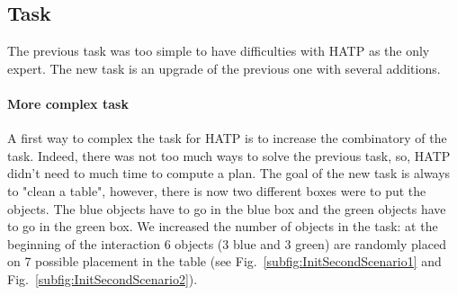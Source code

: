 \documentclass[english,a4paper,11pt,twoside]{StyleThese}
\begin{document}
\subsection{Task}

The previous task was too simple to have difficulties with HATP as the only expert. The new task is an upgrade of the previous one with several additions.


\paragraph{More complex task}

A first way to complex the task for HATP is to increase the combinatory of the task. Indeed, there was not too much ways to solve the previous task, so, HATP didn't need to much time to compute a plan. The goal of the new task is always to "clean a 
table", however, there is now two different boxes were to put the objects. The blue objects have to go in the blue box and the green objects have to go in the green box. We increased the number of objects in the task: at the beginning of the interaction 6 objects (3 blue and 3 green) are randomly placed on 7 possible placement in the table (see Fig.~\ref{subfig:InitSecondScenario1} and Fig.~\ref{subfig:InitSecondScenario2}). 
\end{document}

